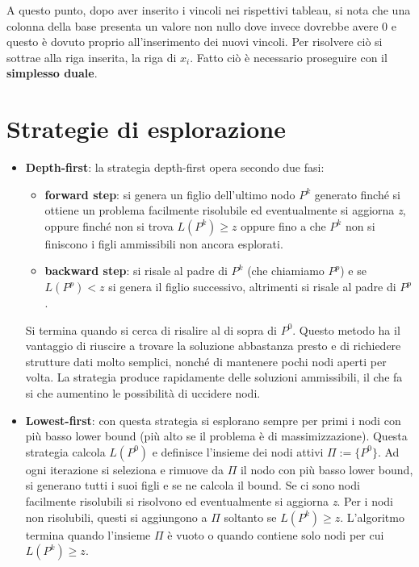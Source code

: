 \documentclass[11pt, oneside]{book}
\begin{document}
\par\bigskip

A questo punto, dopo aver inserito i vincoli nei rispettivi tableau,
si nota che una colonna della base presenta un valore non nullo dove
invece dovrebbe avere 0 e questo \`e dovuto proprio all'inserimento
dei nuovi vincoli. Per risolvere ci\`o si sottrae alla riga inserita,
la riga di $x_i$. Fatto ci\`o \`e necessario proseguire con il {\bf
  simplesso duale}.

\section{Strategie di esplorazione}

\begin{itemize}

\item {\bf Depth-first}: la strategia depth-first opera secondo due
  fasi:

  \begin{itemize}
  \item {\bf forward step}: si genera un figlio dell'ultimo nodo $P^k$
    generato finch\'e si ottiene un problema facilmente risolubile ed
    eventualmente si aggiorna {\em z}, oppure finch\'e non si trova
    $L(P^k) \geq z$ oppure fino a che $P^k$ non si finiscono i figli
    ammissibili non ancora esplorati.

  \item {\bf backward step}: si risale al padre di $P^k$ (che
    chiamiamo $P^p$) e se $L(P^p)<z$ si genera il figlio successivo,
    altrimenti si risale al padre di $P^p$.
  \end{itemize}

  Si termina quando si cerca di risalire al di sopra di $P^0$. Questo
  metodo ha il vantaggio di riuscire a trovare la soluzione abbastanza
  presto e di richiedere strutture dati molto semplici, nonch\'e di
  mantenere pochi nodi aperti per volta. La strategia produce
  rapidamente delle soluzioni ammissibili, il che fa si che aumentino
  le possibilit\`a di uccidere nodi.

\item {\bf Lowest-first}: con questa strategia si esplorano sempre per
  primi i nodi con pi\`u basso lower bound (pi\`u alto se il problema
  \`e di massimizzazione). Questa strategia calcola $L(P^0)$ e
  definisce l'insieme dei nodi attivi $\Pi := \{P^0\}$. Ad ogni
  iterazione si seleziona e rimuove da $\Pi$ il nodo con pi\`u basso
  lower bound, si generano tutti i suoi figli e se ne calcola il
  bound. Se ci sono nodi facilmente risolubili si risolvono ed
  eventualmente si aggiorna {\em z}. Per i nodi non risolubili, questi
  si aggiungono a $\Pi$ soltanto se $L(P^k) \geq z$. L'algoritmo
  termina quando l'insieme $\Pi$ \`e vuoto o quando contiene solo nodi
  per cui $L(P^k) \geq z$.


\end{itemize}
\end{document}

